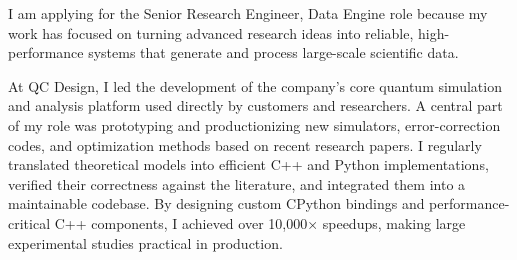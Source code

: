 \documentclass[11pt,a4paper,sans]{moderncv}        %
\begin{document}



I am applying for the Senior Research Engineer, Data Engine role because my work has focused on turning advanced research ideas into reliable, high-performance systems that generate and process large-scale scientific data.

At QC Design, I led the development of the company’s core quantum simulation and analysis platform used directly by customers and researchers. A central part of my role was prototyping and productionizing new simulators, error-correction codes, and optimization methods based on recent research papers. I regularly translated theoretical models into efficient C++ and Python implementations, verified their correctness against the literature, and integrated them into a maintainable codebase. By designing custom CPython bindings and performance-critical C++ components, I achieved over 10,000× speedups, making large experimental studies practical in production.
\end{document}
